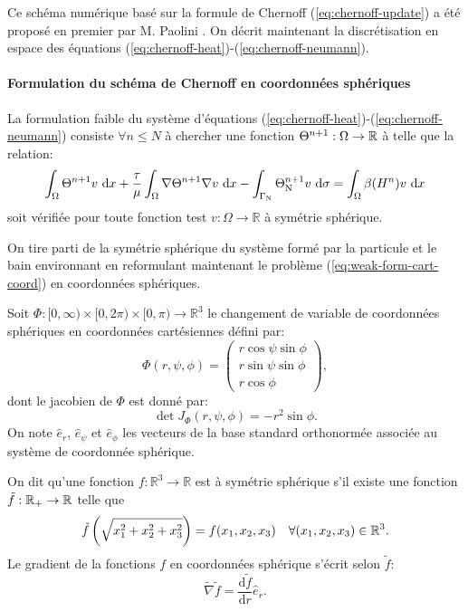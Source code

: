Ce schéma numérique basé sur la formule de Chernoff
(\ref{eq:chernoff-update}) a été proposé en premier par M. Paolini
\cite{Paolini1988}. On décrit maintenant la discrétisation en
espace des équations (\ref{eq:chernoff-heat})-(\ref{eq:chernoff-neumann}).


\paragraph{Formulation du schéma de Chernoff en coordonnées sphériques}
La formulation faible du système d'équations
(\ref{eq:chernoff-heat})-(\ref{eq:chernoff-neumann}) consiste $\forall
n\leq N$ à chercher une fonction $\Theta^{n+1}:\Omega\to\mathbb R$
à telle que la relation:
\begin{equation}\label{eq:weak-form-cart-coord}
  \int_\Omega \temperature^{n+1} v\,\intd{x} + \frac{\tau}{\mu} %
  \int_\Omega \nabla \temperature^{n+1} \nabla v\,\intd{x} - %
  \int_{\Gamma_\mathrm{N}} \temperature^{n+1}_\mathrm{N} v\,\intd{\sigma} %
  = \int_\Omega \beta(\enthalpydensity^n)v\,\intd{x}
\end{equation}
soit vérifiée pour toute fonction test $v:\Omega\to\mathbb R$ à
symétrie sphérique.

On tire parti de la symétrie sphérique du système formé par la
particule et le bain environnant en reformulant maintenant le
problème (\ref{eq:weak-form-cart-coord}) en coordonnées sphériques.

Soit $\Phi:[0,\infty)\times[0,2\pi)\times[0,\pi)\to\mathbb R^3$ le
changement de variable de coordonnées sphériques en coordonnées
cartésiennes défini par:
\begin{equation}
  \Phi(r, \psi, \phi) = \begin{pmatrix}
    r\cos\psi\sin\phi\\
    r\sin\psi\sin\phi\\
    r\cos\phi
  \end{pmatrix},
\end{equation}
dont le jacobien de $\Phi$ est donné par:
\begin{equation}\label{eq:spherical-jacobian}
  \det J_\Phi(r, \psi,\phi) = -r^2\sin\phi.
\end{equation}
On note $\hat e_r$, $\hat e_\psi$ et $\hat e_\phi$ les vecteurs de la
base standard orthonormée associée au système de coordonnée sphérique.

On dit qu'une fonction $f:\mathbb R^3\to\mathbb R$ est à symétrie
sphérique s'il existe une fonction $\tilde f:\mathbb
{\mathbb R_+}\to\mathbb R$ telle que
\begin{equation}\label{eq:spherical-symmetry}
  \tilde f\left( \sqrt{x_1^2 + x_2^2 + x_3^2} \right) = f(x_1, x_2,
  x_3)\quad \forall(x_1, x_2,x_3)\in\mathbb R^3.
\end{equation}
Le gradient de la fonctions $f$ en coordonnées sphérique s'écrit selon
$\tilde f$:
\begin{equation}\label{eq:spherical-gradient}
  \tilde\nabla\tilde f = \frac{\mathrm d\tilde f}{\mathrm dr}\hat e_r.
\end{equation}

